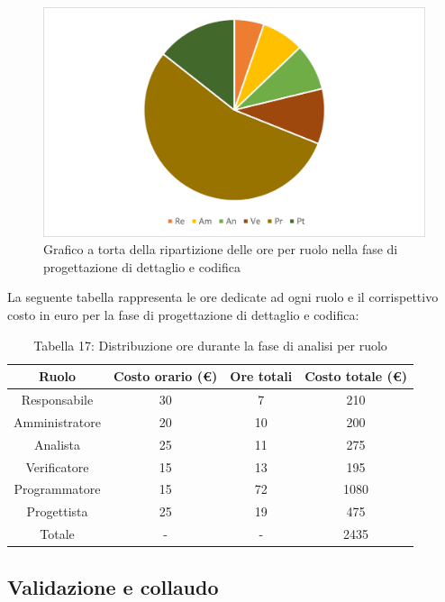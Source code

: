 \begin{figure}[H]
    \centering
    \includegraphics[scale=0.6]{img/grafi preventivo/torta/codifica/complessivo.png}
    \caption{Grafico a torta della ripartizione delle ore per ruolo nella fase di progettazione di dettaglio e codifica}
\end{figure}
La seguente tabella rappresenta le ore dedicate ad ogni ruolo e il corrispettivo costo in euro per la fase di progettazione di dettaglio e codifica:
\begin{table}[h]
	\setlength\extrarowheight{5pt}
	\centering
	\begin{tabularx}{\textwidth}{|ccc|c|}
		\hline
		\rowcolor{white}
		\textbf{Ruolo} & \textbf{Costo orario (€)} & \textbf{Ore totali} & \textbf{Costo totale (€)} \\
		\hline
		Responsabile &30&7&210 \\
		Amministratore &20&10&200 \\
		Analista &25&11&275 \\
		Verificatore &15&13&195 \\
		Programmatore &15&72&1080 \\
		Progettista &25&19&475 \\
		\hline
		Totale &-&-&2435 \\
		\hline
	\end{tabularx}
    \vspace{10pt}
	\caption{Tabella 17: Distribuzione ore durante la fase di analisi per ruolo}
\end{table}
\subsection{Validazione e collaudo}

